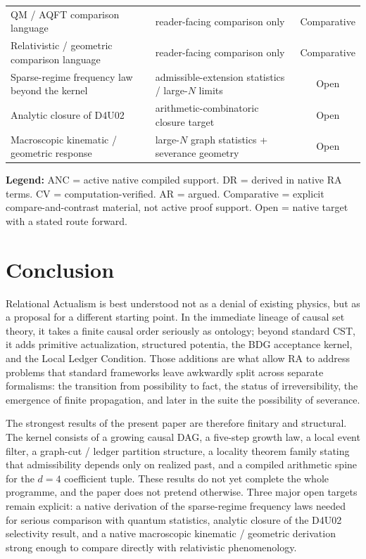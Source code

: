 \documentclass[11pt]{article}
\begin{document}
\begin{center}
\begin{tabular}{llc}
QM / AQFT comparison language & reader-facing comparison only & Comparative \\
Relativistic / geometric comparison language & reader-facing comparison only & Comparative \\
Sparse-regime frequency law beyond the kernel & admissible-extension statistics / large-$N$ limits & Open \\
Analytic closure of D4U02 & arithmetic-combinatoric closure target & Open \\
Macroscopic kinematic / geometric response & large-$N$ graph statistics + severance geometry & Open \\
\bottomrule
\end{tabular}
\end{center}

\textbf{Legend:} ANC = active native compiled support. DR = derived in native RA terms. CV = computation-verified. AR = argued. Comparative = explicit compare-and-contrast material, not active proof support. Open = native target with a stated route forward.

\section{Conclusion}
\label{sec:conclusion}

Relational Actualism is best understood not as a denial of existing physics, but as a proposal for a different starting point. In the immediate lineage of causal set theory, it takes a finite causal order seriously as ontology; beyond standard CST, it adds primitive actualization, structured potentia, the BDG acceptance kernel, and the Local Ledger Condition. Those additions are what allow RA to address problems that standard frameworks leave awkwardly split across separate formalisms: the transition from possibility to fact, the status of irreversibility, the emergence of finite propagation, and later in the suite the possibility of severance.

The strongest results of the present paper are therefore finitary and structural. The kernel consists of a growing causal DAG, a five-step growth law, a local event filter, a graph-cut / ledger partition structure, a locality theorem family stating that admissibility depends only on realized past, and a compiled arithmetic spine for the $d=4$ coefficient tuple. These results do not yet complete the whole programme, and the paper does not pretend otherwise. Three major open targets remain explicit: a native derivation of the sparse-regime frequency laws needed for serious comparison with quantum statistics, analytic closure of the D4U02 selectivity result, and a native macroscopic kinematic / geometric derivation strong enough to compare directly with relativistic phenomenology.
\end{document}
